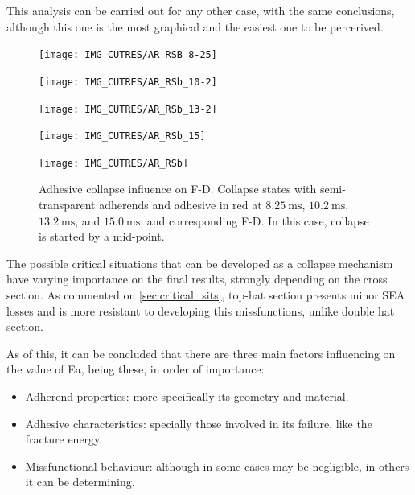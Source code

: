 \documentclass[cmfonts]{witpress}
\begin{document}
This analysis can be carried out for any other case, with the same conclusions, although this one is the most graphical and the easiest one to be percerived.

\begin{figure}
	\centering
	\begin{minipage}[b]{.35\linewidth}
		\centering
		\begin{minipage}[b]{\linewidth}
		\texttt{[image: IMG\_CUTRES/AR\_RSB\_8-25]}
		\end{minipage}
		\quad
		\begin{minipage}[b]{\linewidth}
		\texttt{[image: IMG\_CUTRES/AR\_RSb\_10-2]}
		\end{minipage}
		\quad
		\begin{minipage}[b]{\linewidth}
		\texttt{[image: IMG\_CUTRES/AR\_RSb\_13-2]}
		\end{minipage}
		\quad
		\begin{minipage}[b]{\linewidth}
		\texttt{[image: IMG\_CUTRES/AR\_RSb\_15]}
		\end{minipage}
	\end{minipage}
	\quad
	\begin{minipage}[b]{.6\linewidth}
		\texttt{[image: IMG\_CUTRES/AR\_RSb]}
	\end{minipage}
\caption[Adhesive collapse influence on F-D.]{Adhesive collapse influence on F-D. Collapse states with semi-transparent adherends and adhesive in red at $\SI{8.25}{\ms}$, $\SI{10.2}{\ms}$, $\SI{13.2}{\ms}$, and $\SI{15.0}{\ms}$; and corresponding F-D. In this case, collapse is started by a mid-point.}
\label{fig:ads_collapse_progresion}
\end{figure}

The possible critical situations that can be developed as a collapse mechanism have varying importance on the final results, strongly depending on the cross section. As commented on \cref{sec:critical_sits}, top-hat section presents minor SEA losses and is more resistant to developing this missfunctions, unlike double hat section.

As of this, it can be concluded that there are three main factors influencing on the value of Ea, being these, in order of importance:
\begin{itemize}
	\item Adherend properties: more specifically its geometry and material.
	\item Adhesive characteristics: specially those involved in its failure, like the fracture energy.
	\item Missfunctional behaviour: although in some cases may be negligible, in others it can be determining.
\end{itemize}
\end{document}
